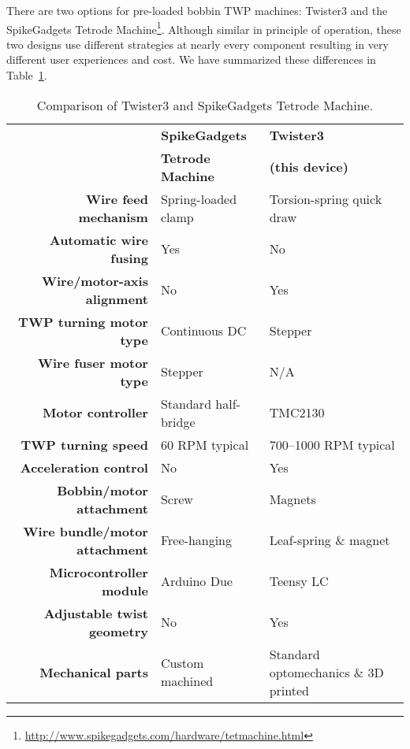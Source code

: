 \documentclass[11pt,a4paper]{article}
\begin{document}
There are two options for pre-loaded bobbin TWP machines: Twister3 and the
SpikeGadgets Tetrode
Machine\footnote{\url{http://www.spikegadgets.com/hardware/tetmachine.html}}.
Although similar in principle of operation, these two designs use different
strategies at nearly every component resulting in very different user
experiences and cost. We have summarized these differences in
Table~\ref{t:compare}.

\setlength{\tabcolsep}{10pt}

\begin{table}[!htbp]
\centering
\caption{Comparison of Twister3 and SpikeGadgets Tetrode Machine.}
\label{t:compare}

\begin{tabular}{rll}
\toprule
&
\textbf{SpikeGadgets} &
\textbf{Twister3} \\
&
\textbf{Tetrode Machine} &
\textbf{(this device)} \\

\cmidrule{2-3}

\textbf{Wire feed mechanism}            & Spring-loaded clamp   & Torsion-spring quick draw  \\
\textbf{Automatic wire fusing}          & Yes                   & No \\
\textbf{Wire/motor-axis alignment}      & No                    & Yes \\
\textbf{TWP turning motor type}         & Continuous DC         & Stepper \\
\textbf{Wire fuser motor type}          & Stepper               & N/A \\
\textbf{Motor controller}               & Standard half-bridge  & TMC2130 \\
\textbf{TWP turning speed}              & 60 RPM typical        & 700--1000 RPM typical \\
\textbf{Acceleration control}           & No                    & Yes \\
\textbf{Bobbin/motor attachment}        & Screw                 & Magnets \\
\textbf{Wire bundle/motor attachment}   & Free-hanging          & Leaf-spring \& magnet \\
\textbf{Microcontroller module}         & Arduino Due           & Teensy LC \\
\textbf{Adjustable twist geometry }     & No                    & Yes \\
\textbf{Mechanical parts}               & Custom machined       & Standard optomechanics \& 3D printed \\
\bottomrule
\end{tabular}
\end{table}
\end{document}
